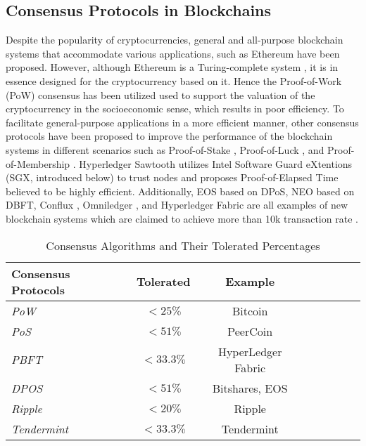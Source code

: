 \subsection{Consensus Protocols in Blockchains}

Despite the popularity of cryptocurrencies, general and all-purpose blockchain systems that accommodate various applications, such as Ethereum \cite{wood2014ethereum} have been proposed. However, although Ethereum is a Turing-complete system \cite{wood2014ethereum}, it is in essence designed for the cryptocurrency based on it. Hence the Proof-of-Work (PoW) consensus has been utilized used to support the valuation of the cryptocurrency in the socioeconomic sense, which results in poor efficiency. To facilitate general-purpose applications in a more efficient manner, other consensus protocols have been proposed to improve the performance of the blockchain systems in different scenarios such as Proof-of-Stake \cite{kiayias2017ouroboros}, Proof-of-Luck \cite{milutinovic2016proof}, and Proof-of-Membership \cite{kogias2016enhancing}. Hyperledger Sawtooth \cite{sawtooth} utilizes Intel Software Guard eXtentions (SGX, introduced below) to trust nodes and proposes Proof-of-Elapsed Time believed to be highly efficient. Additionally, EOS \cite{eosio} based on DPoS, NEO \cite{hoxha2018hashgraph} based on DBFT, Conflux \cite{li2018scaling}, Omniledger \cite{kokoris2018omniledger}, and Hyperledger Fabric \cite{cachin2016architecture} are all examples of new blockchain systems which are claimed to achieve more than 10k transaction rate \cite{bach2018comparative}.

\begin{table}
	\begin{tabular}{l*{6}{c}r}
		Consensus Protocols & Tolerated & Example \\
		\hline		
		\textit{PoW} & $<25\%$ & Bitcoin \\
		\textit{PoS} & $<51\%$ & PeerCoin \\
		\textit{PBFT} & $<33.3\%$ & HyperLedger Fabric \\
		\textit{DPOS} & $<51\%$ & Bitshares, EOS\\
		\textit{Ripple} & $<20\%$ & Ripple \\
		\textit{Tendermint} & $<33.3\%$ & Tendermint \\
	\end{tabular}
	\caption{Consensus Algorithms and Their Tolerated Percentages}
	\label{tab:packet1}
\end{table}

